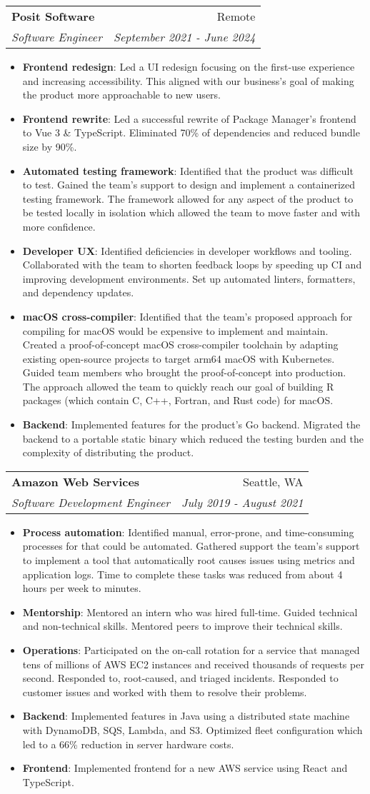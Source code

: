 \documentclass[letterpaper,11pt]{article}
\makeatletter
\newcommand{\resumeItem}[2]{
  \item\small{
    \textbf{#1}{: #2 \vspace{-2pt}}
  }
}
\newcommand{\resumeSubheading}[4]{
  \vspace{-1pt}\item
    \begin{tabular*}{0.97\textwidth}[t]{l@{\extracolsep{\fill}}r}
      \textbf{#1} & #2 \\
      \textit{\small#3} & \textit{\small #4} \\
    \end{tabular*}\vspace{-5pt}
}
\newcommand{\resumeItemListStart}{\begin{itemize}}
\newcommand{\resumeItemListEnd}{\end{itemize}\vspace{-5pt}}
\makeatother
\begin{document}
    \resumeSubheading
      {Posit Software}{Remote}
      {Software Engineer}{September 2021 - June 2024}
      \resumeItemListStart
        \resumeItem{Frontend redesign}{Led a UI redesign focusing on the first-use experience and increasing accessibility. This aligned with our business's goal of making the product more approachable to new users.}
        \resumeItem{Frontend rewrite}{Led a successful rewrite of Package Manager's frontend to Vue 3 \& TypeScript. Eliminated 70\% of dependencies and reduced bundle size by 90\%.}
        \resumeItem{Automated testing framework}{Identified that the product was difficult to test. Gained the team's support to design and implement a containerized testing framework. The framework allowed for any aspect of the product to be tested locally in isolation which allowed the team to move faster and with more confidence.}
        \resumeItem{Developer UX}{Identified deficiencies in developer workflows and tooling. Collaborated with the team to shorten feedback loops by speeding up CI and improving development environments. Set up automated linters, formatters, and dependency updates.}
        \resumeItem{macOS cross-compiler}{Identified that the team's proposed approach for compiling for macOS would be expensive to implement and maintain. Created a proof-of-concept macOS cross-compiler toolchain by adapting existing open-source projects to target arm64 macOS with Kubernetes. Guided team members who brought the proof-of-concept into production. The approach allowed the team to quickly reach our goal of building R packages (which contain C, C++, Fortran, and Rust code) for macOS.}
        \resumeItem{Backend}{Implemented features for the product's Go backend. Migrated the backend to a portable static binary which reduced the testing burden and the complexity of distributing the product.}
      \resumeItemListEnd

    \resumeSubheading
      {Amazon Web Services}{Seattle, WA}
      {Software Development Engineer}{July 2019 - August 2021}
      \resumeItemListStart
        \resumeItem{Process automation}{Identified manual, error-prone, and time-consuming processes for that could be automated. Gathered support the team's support to implement a tool that automatically root causes issues using metrics and application logs. Time to complete these tasks was reduced from about 4 hours per week to minutes.}
        \resumeItem{Mentorship}{Mentored an intern who was hired full-time. Guided technical and non-technical skills. Mentored peers to improve their technical skills.}
        \resumeItem{Operations}{Participated on the on-call rotation for a service that managed tens of millions of AWS EC2 instances and received thousands of requests per second. Responded to, root-caused, and triaged incidents. Responded to customer issues and worked with them to resolve their problems.}
        \resumeItem{Backend}{Implemented features in Java using a distributed state machine with DynamoDB, SQS, Lambda, and S3. Optimized fleet configuration which led to a 66\% reduction in server hardware costs.}
        \resumeItem{Frontend}{Implemented frontend for a new AWS service using React and TypeScript.}
        \resumeItemListEnd
\end{document}
